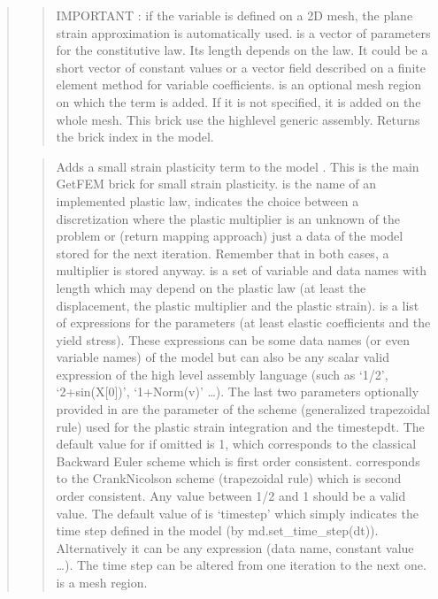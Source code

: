 \documentclass[a4paper,11pt,english]{sphinxmanual}
\begin{document}
\begin{quote}
\begin{quote}
IMPORTANT : if the variable is defined on a 2D mesh, the plane strain
approximation is automatically used.
 is a vector of parameters for the constitutive law. Its length
depends on the law. It could be a short vector of constant values or a
vector field described on a finite element method for variable
coefficients.  is an optional mesh region on which the term
is added. If it is not specified, it is added on the whole mesh.
This brick use the high\sphinxhyphen{}level generic assembly.
Returns the brick index in the model.
\end{quote}

\begin{quote}

Adds a small strain plasticity term to the model . This is the
main GetFEM brick for small strain plasticity.  is the name
of an implemented plastic law,  indicates the choice
between a discretization where the plastic multiplier is an unknown of
the problem or (return mapping approach) just a data of the model
stored for the next iteration. Remember that in both cases, a multiplier
is stored anyway.  is a set of variable and data names with
length which may depend on the plastic law (at least the displacement,
the plastic multiplier and the plastic strain).  is a list of
expressions for the parameters (at least elastic coefficients and the
yield stress). These expressions can be some data names (or even
variable names) of the model but can also be any scalar valid expression
of the high level assembly language (such as ‘1/2’, ‘2+sin(X{[}0{]})’,
‘1+Norm(v)’ …). The last two parameters optionally provided in
 are the  parameter of the \sphinxhyphen{}scheme (generalized
trapezoidal rule) used for the plastic strain integration and the
time\sphinxhyphen{}step\textasciigrave{}dt\textasciigrave{}. The default value for  if omitted is 1, which
corresponds to the classical Backward Euler scheme which is first order
consistent.  corresponds to the Crank\sphinxhyphen{}Nicolson scheme
(trapezoidal rule) which is second order consistent. Any value
between 1/2 and 1 should be a valid value. The default value of  is
‘timestep’ which simply indicates the time step defined in the model
(by md.set\_time\_step(dt)). Alternatively it can be any expression
(data name, constant value …). The time step can be altered from one
iteration to the next one.  is a mesh region.


\end{quote}
\end{quote}
\end{document}
